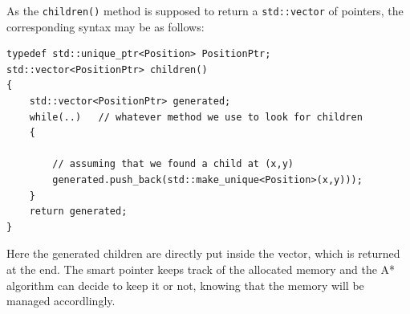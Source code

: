 \documentclass{ecnreport}
\begin{document}
As the \texttt{children()} method is supposed to return a \texttt{std::vector} of pointers, the corresponding syntax may be as follows:
\begin{center}\cppstyle
\begin{lstlisting}
typedef std::unique_ptr<Position> PositionPtr;
std::vector<PositionPtr> children()
{
    std::vector<PositionPtr> generated;
    while(..)   // whatever method we use to look for children
    {
    
        // assuming that we found a child at (x,y)
        generated.push_back(std::make_unique<Position>(x,y)));
    }
    return generated;
}
\end{lstlisting}
\end{center}
Here the generated children are directly put inside the vector, which is returned at the end. The smart pointer keeps track 
of the allocated memory and the A* algorithm can decide to keep it or not, knowing that the memory will be managed accordlingly.
\end{document}
